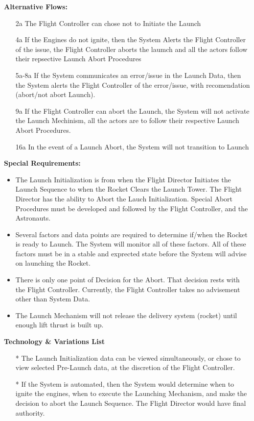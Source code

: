 \documentclass[letterpaper]{article}
\begin{document}
\textbf{Alternative Flows:}
\begin{itemize}
\item[2a]The Flight Controller can chose not to Initiate the Launch
\item[4a]If the Engines do not ignite, then the System Alerts the
Flight Controller of the issue, the Flight Controller aborts the
laumch and all the actors follow their repsective Launch Abort
Procedures
\item[5a-8a]If the System communicates an error/issue in the Launch
Data, then the System alerts the Flight Controller of the error/issue,
with recomendation (abort/not abort Launch).
\item[9a]If the Flight Controller can abort the Launch, the
System will not activate the Launch Mechinism, all the actors are to
follow their respective Launch Abort Procedures.
\item[16a]In the event of a Launch Abort, the System will not
transition to Launch
\end{itemize}
\textbf{Special Requirements:}
\begin{itemize}
\item The Launch Initialization is from when the Flight Director
Initiates the Launch Sequence to when the Rocket Clears the Launch
Tower.  The Flight Director has the ability to Abort the Lauch
Initialization.  Special Abort Procedures must be developed and
followed by the Flight Controller, and the Astronauts.
\item Several factors and data points are required to determine
if/when the Rocket is ready to Launch.  The System will monitor all
of these factors.  All of these factors must be in a stable and
exprected state before the System will advise on launching the Rocket.
\item There is only one point of Decision for the Abort.  That decision
rests with the Flight Controller.  Currently, the Flight Controller
takes no advisement other than System Data.
\item The Launch Mechanism will not release the delivery system
(rocket) until enough lift thrust is built up.
\end{itemize}
\textbf{Technology \& Variations List}
\begin{itemize}
\item[*] The Launch Initialization data can be viewed simultaneously,
or chose to view selected Pre-Launch data, at the discretion of the Flight
Controller.
\item[*]  If the System is automated, then the System would determine
when to ignite the engines, when  to execute the Launching
Mechanism, and make the decision to abort the Launch Sequence.  The
Flight Director would have final authority.
\end{itemize}
\end{document}
